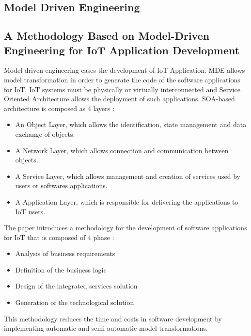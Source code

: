 
\subsection{Model Driven Engineering}

\subsection{A Methodology Based on Model-Driven Engineering for IoT Application Development}
Model driven engineering eases the development of IoT Application. MDE allows model transformation in order to generate the code of the software applications for IoT. IoT systems must be physically or virtually interconnected and Service Oriented Architecture allows the deployment of such applications. SOA-based architecture is composed as 4 layers :
\begin{itemize}
    \item 
An Object Layer, which allows the identification, state management and data exchange of objects.
    \item
A Network Layer, which allows connection and communication between objects.
    \item A Service Layer, which allows management and creation of services used by users or softwares applications.
    \item
A Application Layer, which is responsible for delivering the applications to IoT users.

\end{itemize}

The paper introduces a methodology for the development of software applications for IoT that is composed of 4 phase : 
\begin{itemize}
    \item 
Analysis of business requirements
\item
Definition of the business logic
\item
Design of the integrated services solution
\item
Generation of the technological solution
\end{itemize}
This methodology reduces the time and costs in software development by implementing automatic and semi-automatic model transformations.

